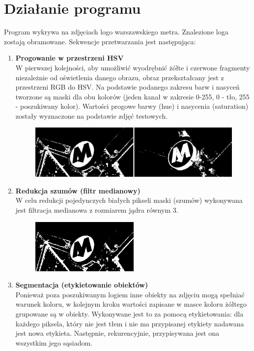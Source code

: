 \documentclass{article}
\begin{document}
\section{Działanie programu}
Program wykrywa na zdjęciach logo warszawskiego metra. Znalezione loga zostają obramowane. Sekwencje przetwarzania jest następująca:
\begin{enumerate}
	\item \textbf{Progowanie w przestrzeni HSV} \\
	W pierwszej kolejności, aby umożliwić wyodrębnić żółte i czerwone fragmenty niezależnie od oświetlenia danego obrazu, obraz przekształcany jest z przestrzeni RGB do HSV. Na podstawie podanego zakresu barw i nasyceń tworzone są maski dla obu kolorów (jeden kanał w zakresie 0-255, 0 - tło, 255 - poszukiwany kolor). Wartości progowe barwy (hue) i nasycenia (saturation) zostały wyznaczone na podstawie zdjęć testowych.
	\begin{figure}[h]
		\centering
		\includegraphics[width=1\textwidth]{masks.jpg}	
	\end{figure}
	\item \textbf{Redukcja szumów (filtr medianowy)} \\
	W celu redukcji pojedynczych białych pikseli maski (szumów) wykonywana jest filtracja medianowa z rozmiarem jądra równym 3. 
	\begin{figure}[h]
		\centering
		\includegraphics[width=0.5\textwidth]{rankFilter.jpg}	
	\end{figure}
	\item \textbf{Segmentacja (etykietowanie obiektów)}\\
	Ponieważ poza poszukiwanym logiem inne obiekty na zdjęciu mogą spełniać warunek koloru, w kolejnym kroku wartości zapisane w masce koloru żółtego grupowane są w obiekty. Wykonywane jest to za pomocą etykietowania: dla każdego piksela, który nie jest tłem i nie ma przypisanej etykiety nadawana jest nowa etykieta. Następnie, rekurencyjnie, przypisywana jest ona wszystkim jego sąsiadom.

\end{enumerate}
\end{document}
